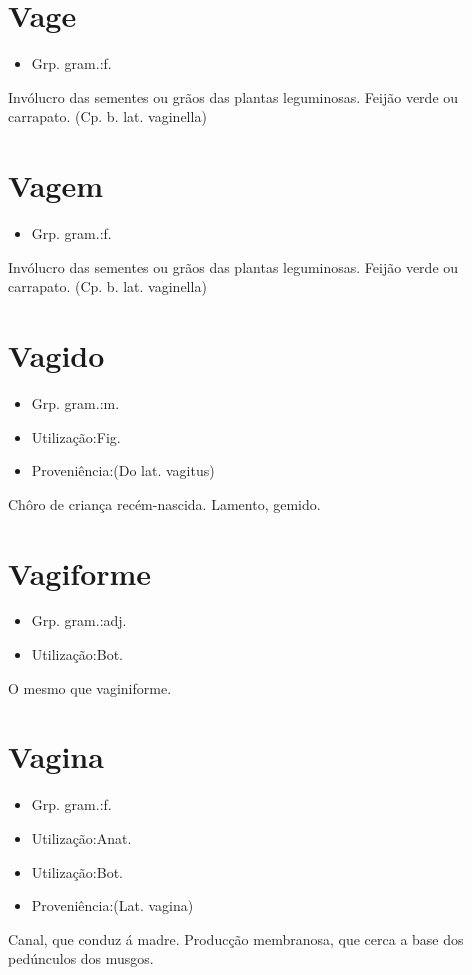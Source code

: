 \documentclass{article}
\begin{document}
\section{Vage}
\begin{itemize}
\item {Grp. gram.:f.}
\end{itemize}
Invólucro das sementes ou grãos das plantas leguminosas.
Feijão verde ou carrapato.
(Cp. b. lat. \textunderscore vaginella\textunderscore )
\section{Vagem}
\begin{itemize}
\item {Grp. gram.:f.}
\end{itemize}
Invólucro das sementes ou grãos das plantas leguminosas.
Feijão verde ou carrapato.
(Cp. b. lat. \textunderscore vaginella\textunderscore )
\section{Vagido}
\begin{itemize}
\item {Grp. gram.:m.}
\end{itemize}
\begin{itemize}
\item {Utilização:Fig.}
\end{itemize}
\begin{itemize}
\item {Proveniência:(Do lat. \textunderscore vagitus\textunderscore )}
\end{itemize}
Chôro de criança recém-nascida.
Lamento, gemido.
\section{Vagiforme}
\begin{itemize}
\item {Grp. gram.:adj.}
\end{itemize}
\begin{itemize}
\item {Utilização:Bot.}
\end{itemize}
O mesmo que \textunderscore vaginiforme\textunderscore .
\section{Vagina}
\begin{itemize}
\item {Grp. gram.:f.}
\end{itemize}
\begin{itemize}
\item {Utilização:Anat.}
\end{itemize}
\begin{itemize}
\item {Utilização:Bot.}
\end{itemize}
\begin{itemize}
\item {Proveniência:(Lat. \textunderscore vagina\textunderscore )}
\end{itemize}
Canal, que conduz á madre.
Producção membranosa, que cerca a base dos pedúnculos dos musgos.
\end{document}

